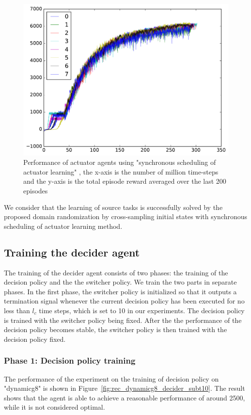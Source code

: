 \begin{figure}[!htbp]
	\includegraphics[width=\textwidth]{images/rec_sync_training.pdf}
	\centering
	\caption{Performance of actuator agents using "synchronous scheduling of actuator learning" , the x-axis is the number of million time-steps and the y-axis is the total episode reward averaged over the last 200 episodes}\label{rec_sync_training}
\end{figure}

We consider that the learning of source tasks is successfully solved by the proposed domain randomization by cross-sampling initial states with  synchronous scheduling of actuator learning method.
\subsection{Training the decider agent}
The training of the decider agent consists of two phases: the training of the decision policy and the the switcher policy. We train the two parts in separate phases. In the first phase, the switcher policy is initialized so that it outputs a termination signal whenever the current decision policy has been executed for no less than $l_c$ time steps, which is set to 10 in our experiments. The decision policy is trained with the switcher policy being fixed. After the the performance of the decision policy becomes stable, the switcher policy is then trained with the decision policy fixed.

\subsubsection{Phase 1: Decision policy training}
The performance of the experiment on the training of decision policy on "dynamicg8" is shown in Figure~\ref{fig:rec_dynamicg8_decider_subt10}. The result shows that the agent is able to achieve a reasonable performance of around 2500, while it is not considered optimal.

